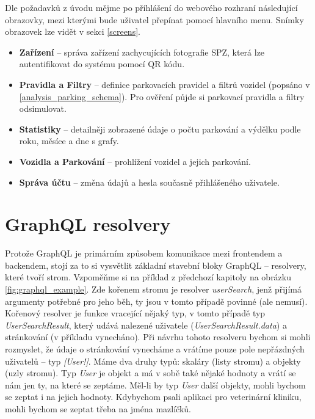 \noindent
Dle požadavků z úvodu mějme po příhlášení do webového rozhraní následující obrazovky,
mezi kterými bude uživatel přepínat pomocí hlavního menu.
Snímky obrazovek lze vidět v sekci \ref{screens}.

\begin{itemize}
  \setlength\itemsep{.05em}
  \item \textbf{Zařízení} -- správa zařízení zachycujících fotografie SPZ, která lze autentifikovat do systému pomocí
        QR kódu.
  \item \textbf{Pravidla a Filtry} -- definice parkovacích pravidel a filtrů vozidel (popsáno v \ref{analysis_parking_schema}).
        Pro ověření půjde si parkovací pravidla a filtry odsimulovat.
  \item \textbf{Statistiky} -- detailněji zobrazené údaje o počtu parkování a výdělku podle roku, měsíce a dne s grafy.
  \item \textbf{Vozidla a Parkování} -- prohlížení vozidel a jejich parkování.
  \item \textbf{Správa účtu} -- změna údajů a hesla současně přihlášeného uživatele.
\end{itemize}

\section{GraphQL resolvery}

\noindent
Protože GraphQL je primárním způsobem komunikace mezi frontendem a backendem, stojí za to si vysvětlit základní stavební bloky
GraphQL -- resolvery, které tvoří strom. Vzpoměňme si na příklad z předchozí kapitoly na obrázku \ref{fig:graphql_example}.
Zde kořenem stromu je resolver \textit{userSearch}, jenž přijímá argumenty potřebné pro jeho běh, ty jsou v tomto případě
povinné (ale nemusí). Kořenový resolver je funkce vracející nějaký typ, v tomto případě typ \textit{UserSearchResult}, který udává nalezené
uživatele (\textit{UserSearchResult.data}) a stránkování (v příkladu vynecháno).
Při návrhu tohoto resolveru bychom si mohli rozmyslet, že údaje o stránkování vynecháme a vrátíme pouze
pole nepřázdných uživatelů -- typ \textit{[User!]}.
Máme dva druhy typů: skaláry (listy stromu) a objekty (uzly stromu).
Typ \textit{User} je objekt a má v sobě také nějaké hodnoty a vrátí se nám jen ty, na které se zeptáme. Měl-li by typ \textit{User}
další objekty, mohli bychom se zeptat i na jejich hodnoty. Kdybychom psali aplikaci pro veterinární kliniku, mohli bychom se zeptat
třeba na jména mazlíčků.

